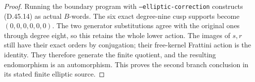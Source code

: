 \begin{proof}
Running the boundary
program with
\texttt{--elliptic-correction}
constructs (D.45.14)
as actual \(B\)-words.
The six exact
degree-nine cusp
supports become
\((0,0,0,0,0,0)\).
The two generator
substitutions agree
with the original
ones through degree
eight, so this
retains the whole
lower action.
The images of
\(s,r\) still
have their exact
orders by
conjugation; their
free-kernel Frattini
action is the
identity. They
therefore generate
the finite quotient,
and the resulting
endomorphism is an
automorphism.
This proves the
second branch
conclusion in its
stated finite
elliptic source.
\end{proof}

